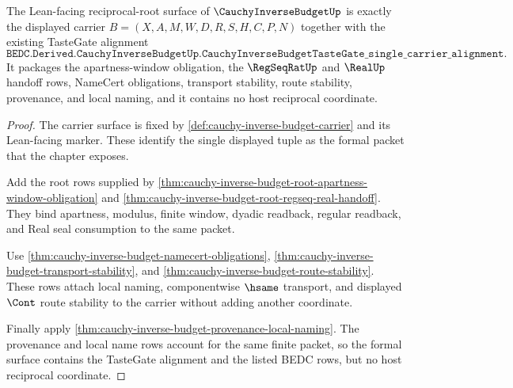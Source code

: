 \begin{theorem}
\label{thm:cauchy-inverse-budget-root-formal-surface}
The Lean-facing reciprocal-root surface of $\CauchyInverseBudgetUp$ is exactly the displayed carrier $B=(X,A,M,W,D,R,S,H,C,P,N)$ together with the existing TasteGate alignment
$$
\texttt{BEDC.Derived.CauchyInverseBudgetUp.CauchyInverseBudgetTasteGate\_single\_carrier\_alignment}.
$$
It packages the apartness-window obligation, the $\RegSeqRatUp$ and $\RealUp$ handoff rows, NameCert obligations, transport stability, route stability, provenance, and local naming, and it contains no host reciprocal coordinate.
\end{theorem}
\begin{proof}
The carrier surface is fixed by \autoref{def:cauchy-inverse-budget-carrier} and its Lean-facing marker. These identify the single displayed tuple as the formal packet that the chapter exposes.

Add the root rows supplied by \autoref{thm:cauchy-inverse-budget-root-apartness-window-obligation} and \autoref{thm:cauchy-inverse-budget-root-regseq-real-handoff}. They bind apartness, modulus, finite window, dyadic readback, regular readback, and Real seal consumption to the same packet.

Use \autoref{thm:cauchy-inverse-budget-namecert-obligations}, \autoref{thm:cauchy-inverse-budget-transport-stability}, and \autoref{thm:cauchy-inverse-budget-route-stability}. These rows attach local naming, componentwise $\hsame$ transport, and displayed $\Cont$ route stability to the carrier without adding another coordinate.

Finally apply \autoref{thm:cauchy-inverse-budget-provenance-local-naming}. The provenance and local name rows account for the same finite packet, so the formal surface contains the TasteGate alignment and the listed BEDC rows, but no host reciprocal coordinate.
\end{proof}

